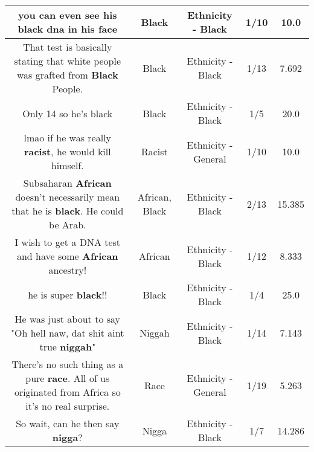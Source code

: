 \documentclass[11pt]{article}
\newlength\mylength
\begin{document}
\begin{center}
\begin{longtable}{|C{.65\mylength}|C{.30\mylength}|C{.12\mylength}|C{.12\mylength}|C{.12\mylength}|}
  \small you can even see his \textbf{black} dna in his face\normalsize   & Black & Ethnicity - Black & 1/10 & 10.0 \\  \hline
  \small That test is basically stating that white people was grafted from \textbf{Black} People.\normalsize   & Black & Ethnicity - Black & 1/13 & 7.692 \\  \hline
  \small Only 14 so he's black\normalsize   & Black & Ethnicity - Black & 1/5 & 20.0 \\  \hline
  \small lmao if he was really \textbf{racist}, he would kill himself.\normalsize   & Racist & Ethnicity - General & 1/10 & 10.0 \\  \hline
  \small Subsaharan \textbf{African} doesn't necessarily mean that he is \textbf{black}. He could be Arab.\normalsize   & African, Black & Ethnicity - Black & 2/13 & 15.385 \\  \hline
  \small I wish to get a DNA test and have some \textbf{African} ancestry!\normalsize   & African & Ethnicity - Black & 1/12 & 8.333 \\  \hline
  \small he is super \textbf{black}!!\normalsize   & Black & Ethnicity - Black & 1/4 & 25.0 \\  \hline
  \small He was just about to say "Oh hell naw, dat shit aint true \textbf{niggah}"\normalsize   & Niggah & Ethnicity - Black & 1/14 & 7.143 \\  \hline
  \small There's no such thing as a pure \textbf{race}. All of us originated from Africa so it's no real surprise.\normalsize   & Race & Ethnicity - General & 1/19 & 5.263 \\  \hline
  \small So wait, can he then say \textbf{nigga}?\normalsize   & Nigga & Ethnicity - Black & 1/7 & 14.286 \\  \hline

\end{longtable}
\end{center}
\end{document}
